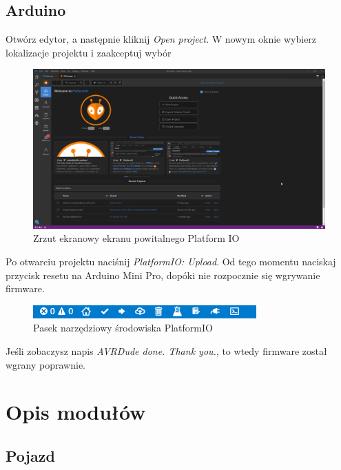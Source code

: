 \documentclass{report}
\begin{document}
    	\section{Arduino}
	    Otwórz edytor, a następnie kliknij \textit{Open project}. W nowym oknie wybierz lokalizacje projektu i zaakceptuj wybór
	    \begin{figure}[H]
	    	\centering
	    	\includegraphics[scale=0.25]{platform_1.png}
	    	\caption{Zrzut ekranowy ekranu powitalnego Platform IO}
	    \end{figure}
	    Po otwarciu projektu naciśnij \textit{PlatformIO: Upload}. Od tego momentu naciskaj przycisk resetu na Arduino Mini Pro, dopóki nie rozpocznie się wgrywanie firmware.
	    \begin{figure}[H]
	    	\centering
	    	\includegraphics[scale=1]{platform_2.png}
	    	\caption{Pasek narzędziowy środowiska PlatformIO}
	    \end{figure}
    	Jeśli zobaczysz napis \textit{AVRDude done. Thank you.}, to wtedy firmware został wgrany poprawnie.
    \chapter{Opis modułów}
    
    \section{Pojazd}
\end{document}
